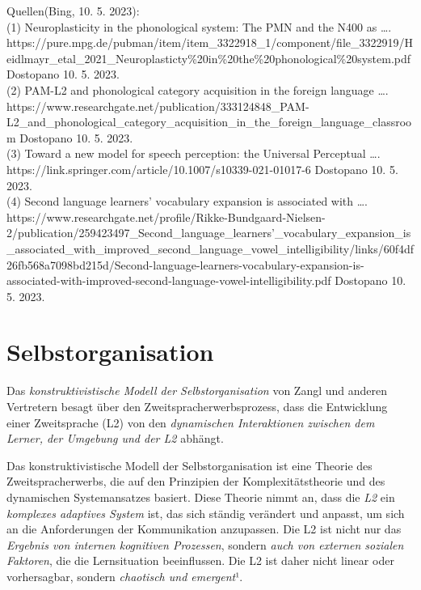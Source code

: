 \documentclass[
  letterpaper,
]{scrbook}
\begin{document}
Quellen(Bing, 10. 5. 2023):\\
(1) Neuroplasticity in the phonological system: The PMN and the N400 as
\ldots.
https://pure.mpg.de/pubman/item/item\_3322918\_1/component/file\_3322919/Heidlmayr\_etal\_2021\_Neuroplasticty\%20in\%20the\%20phonological\%20system.pdf
Dostopano 10. 5. 2023.\\
(2) PAM-L2 and phonological category acquisition in the foreign language
\ldots.
https://www.researchgate.net/publication/333124848\_PAM-L2\_and\_phonological\_category\_acquisition\_in\_the\_foreign\_language\_classroom
Dostopano 10. 5. 2023.\\
(3) Toward a new model for speech perception: the Universal Perceptual
\ldots. https://link.springer.com/article/10.1007/s10339-021-01017-6
Dostopano 10. 5. 2023.\\
(4) Second language learners' vocabulary expansion is associated with
\ldots.
https://www.researchgate.net/profile/Rikke-Bundgaard-Nielsen-2/publication/259423497\_Second\_language\_learners'\_vocabulary\_expansion\_is\_associated\_with\_improved\_second\_language\_vowel\_intelligibility/links/60f4df26fb568a7098bd215d/Second-language-learners-vocabulary-expansion-is-associated-with-improved-second-language-vowel-intelligibility.pdf
Dostopano 10. 5. 2023.

\hypertarget{selbstorganisation}{%
\section{Selbstorganisation}\label{selbstorganisation}}

Das \emph{konstruktivistische Modell der Selbstorganisation} von Zangl
und anderen Vertretern besagt über den Zweitspracherwerbsprozess, dass
die Entwicklung einer Zweitsprache (L2) von den \emph{dynamischen
Interaktionen zwischen dem Lerner, der Umgebung und der L2} abhängt.

Das konstruktivistische Modell der Selbstorganisation ist eine Theorie
des Zweitspracherwerbs, die auf den Prinzipien der Komplexitätstheorie
und des dynamischen Systemansatzes basiert. Diese Theorie nimmt an, dass
die \emph{L2} ein \emph{komplexes adaptives System} ist, das sich
ständig verändert und anpasst, um sich an die Anforderungen der
Kommunikation anzupassen. Die L2 ist nicht nur das \emph{Ergebnis von
internen kognitiven Prozessen}, sondern \emph{auch von externen sozialen
Faktoren}, die die Lernsituation beeinflussen. Die L2 ist daher nicht
linear oder vorhersagbar, sondern \emph{chaotisch und emergent}¹.
\end{document}
